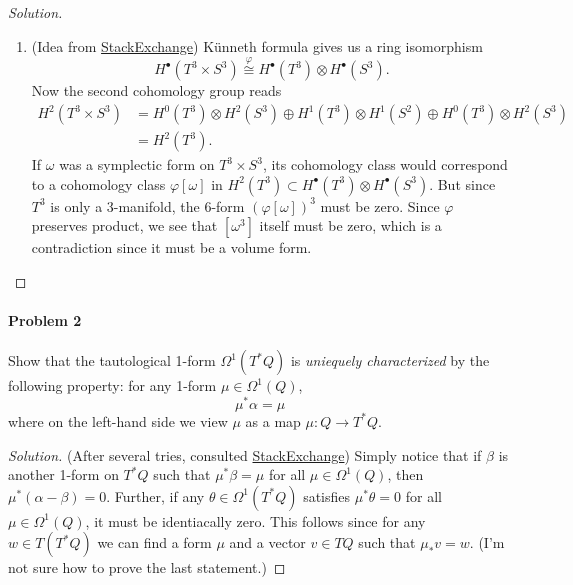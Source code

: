 \begin{proof}[Solution]
\begin{enumerate}[label=\alph*.]
		\item (Idea from \href{https://math.stackexchange.com/questions/2746576/is-mathbbt3-times-mathbbs3-symplectic}{StackExchange}) K\"unneth formula gives us a ring isomorphism 
			\[H^{\bullet}(T^3\times S^3)\overset{\varphi}{\cong}H^{\bullet}(T^3)\otimes H^{\bullet}(S^3).\]
		Now the second cohomology group reads
			\begin{align*}
				H^{2}(T^3\times S^3)& =H^{0}(T^3)\otimes H^{2}(S^3)\oplus H^{1}(T^3)\otimes H^{1}(S^2)\oplus H^{0}(T^3)\otimes H^{2}(S^3)\\
				&=H^{2}(T^3).
			\end{align*}
			If $\omega$ was a symplectic form on $T^3\times S^3$, its cohomology class would correspond to a cohomology class $\varphi[\omega]$ in $H^{2}(T^3)\subset H^{\bullet}(T^3)\otimes H^{\bullet}(S^3)$. But since $T^3$ is only a 3-manifold, the 6-form $(\varphi[\omega])^3$ must be zero. Since $\varphi$ preserves product, we see that $[\omega^3]$ itself must be zero, which is a contradiction since it must be a volume form.
	\end{enumerate}
\end{proof}

\paragraph{Problem 2} Show that the tautological 1-form $\Omega^{1}(T^*Q)$ is \textit{uniequely characterized} by the following property: for any 1-form $\mu\in\Omega^{1}(Q)$,
\[\mu^*\alpha=\mu\]
where on the left-hand side we view  $\mu$ as a map $\mu:Q\to T^*Q$.

\begin{proof}[Solution]\leavevmode
	(After several tries, consulted \href{https://math.stackexchange.com/questions/4141107/a-characterization-of-the-tautological-form-liouville-1-form-on-the-cotangent}{StackExchange}) Simply notice that if $\beta$ is another 1-form on  $T^*Q$ such that $\mu^*\beta=\mu$ for all $\mu\in\Omega^{1}(Q)$, then  $\mu^*(\alpha-\beta)=0$. Further, if any  $\theta\in\Omega^{1}(T^*Q)$ satisfies $\mu^*\theta=0$ for all $\mu\in\Omega^{1}(Q)$, it must be identiacally zero. This follows since for any $w\in T(T^*Q)$ we can find a form $\mu$ and a vector $v\in TQ$ such that $\mu_*v=w$. (I'm not sure how to prove the last statement.)
\end{proof}


